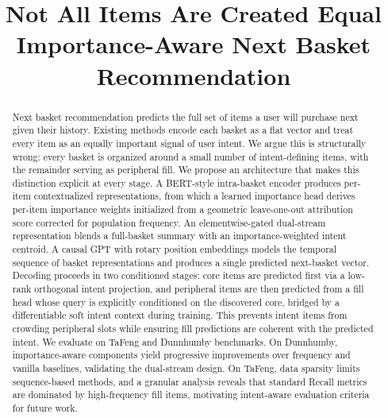 \documentclass[conference]{IEEEtran}
\begin{document}
\title{Not All Items Are Created Equal\\
\vspace{0.5cm}
\large Importance-Aware Next Basket Recommendation}

\author{
\and
{}
\and
{}
\and
{}
}

\maketitle

\begin{abstract}
Next basket recommendation predicts the full set of items a user will
purchase next given their history. Existing methods encode each basket
as a flat vector and treat every item as an equally important signal of
user intent. We argue this is structurally wrong: every basket is
organized around a small number of intent-defining items, with the
remainder serving as peripheral fill. We propose an architecture that
makes this distinction explicit at every stage. A BERT-style intra-basket
encoder produces per-item contextualized representations, from which a
learned importance head derives per-item importance weights initialized
from a geometric leave-one-out attribution score corrected for
population frequency. An elementwise-gated dual-stream representation
blends a full-basket summary with an importance-weighted intent centroid.
A causal GPT with rotary position embeddings models the temporal sequence
of basket representations and produces a single predicted next-basket
vector. Decoding proceeds in two conditioned stages: core items are
predicted first via a low-rank orthogonal intent projection, and
peripheral items are then predicted from a fill head whose query is
explicitly conditioned on the discovered core, bridged by a
differentiable soft intent context during training. This prevents intent
items from crowding peripheral slots while ensuring fill predictions are
coherent with the predicted intent.
We evaluate on TaFeng and Dunnhumby benchmarks. On Dunnhumby,
importance-aware components yield progressive improvements over
frequency and vanilla baselines, validating the dual-stream design.
On TaFeng, data sparsity limits sequence-based methods, and a
granular analysis reveals that standard Recall metrics are dominated
by high-frequency fill items, motivating intent-aware evaluation
criteria for future work.
\end{abstract}
\end{document}
